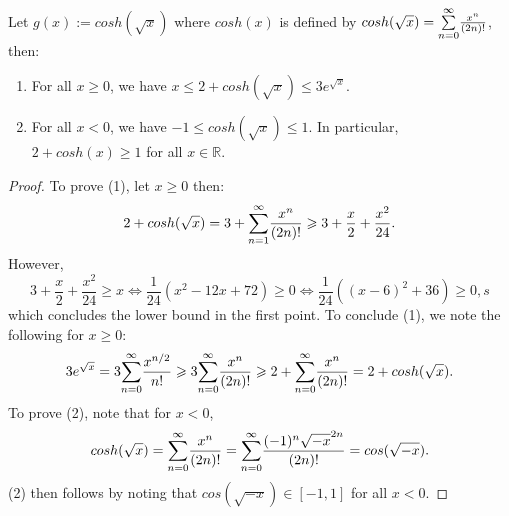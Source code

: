 \begin{remark}
  Let \(g(x):= cosh(\sqrt{x})\) where \(cosh(x)\) is defined by \(cosh(\sqrt{x})=\overunderset{\infty}{n=0}{\sum}\frac{x^n}{(2n)!}\), then: 
  \begin{enumerate}
    \item For all \(x\geq 0\), we have \(x \leq 2+cosh(\sqrt{x}) \leq 3e^{\sqrt{x}}\).
    \item For all \(x <0\), we have \(-1 \leq cosh(\sqrt{x})\leq 1\). In particular, \(2+cosh(x)\geq 1\) for all \(x\in \mathbb{R}\).
  \end{enumerate}
\end{remark}
%
\begin{proof}
  To prove (1), let \(x\geq 0\) then:
  \begin{equation*}
    2+cosh(\sqrt{x}) = 3 + \overunderset{\infty}{n=1}{\sum}\frac{x^n}{(2n)!}\geq 3 + \frac{x}{2}+\frac{x^2}{24}.
  \end{equation*}
  However,
  \begin{equation*}
    3+\frac{x}{2}+\frac{x^2}{24}\geq x \iff \frac{1}{24}(x^2-12x+72)\geq 0 \iff \frac{1}{24}((x-6)^2+36)\geq 0,s
  \end{equation*}
  which concludes the lower bound in the first point. To conclude (1), we note the following for \(x\geq0\): 
  \begin{equation*}
    3e^{\sqrt{x}}= 3\overunderset{\infty}{n=0}{\sum}\frac{x^{n/2}}{n!}\geq 3\overunderset{\infty}{n=0}{\sum}\frac{x^{n}}{(2n)!} \geq 2 + \overunderset{\infty}{n=0}{\sum}\frac{x^{n}}{(2n)!}= 2 + cosh(\sqrt{x}).
  \end{equation*}
  To prove (2), note that for \(x<0\),
  \begin{equation*}
    cosh(\sqrt{x})= \overunderset{\infty}{n=0}{\sum}\frac{x^n}{(2n)!}= \overunderset{\infty}{n=0}{\sum}\frac{(-1)^n \sqrt{-x}^{2n}}{(2n)!}= cos(\sqrt{-x}).
  \end{equation*}
  (2) then follows by noting that \(cos(\sqrt{-x}) \in [-1,1]\) for all \(x<0\). 
\end{proof}


